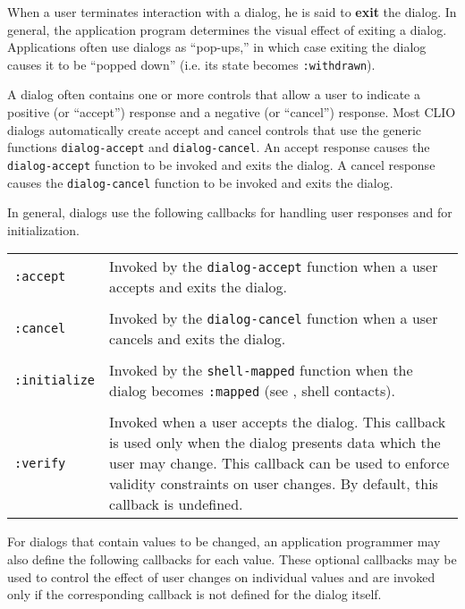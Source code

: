  
When a user terminates
interaction with a dialog, he is said to {\bf exit} the dialog.
 In general, the application program determines the
visual effect of exiting a dialog.  Applications often use dialogs as
``pop-ups,'' in which case exiting the dialog causes it to be ``popped down''
(i.e.  its state becomes {\tt :withdrawn}).  

A dialog often contains one or more controls that allow a user to indicate a
positive (or ``accept'') response and a negative (or ``cancel'') response.
Most CLIO dialogs automatically create accept and cancel controls that use
the generic functions {\tt dialog-accept} and {\tt dialog-cancel}.  An accept
response causes the {\tt dialog-accept} function to be invoked and exits the
dialog.  A cancel response causes the {\tt dialog-cancel} function to be
invoked and exits the dialog.

In general, dialogs use the following callbacks for handling
user responses and for initialization.

\begin{center}
\begin{tabular}[t]{lp{5in}}
{\tt :accept} & Invoked by the {\tt dialog-accept} function when a user accepts and
exits the dialog. \\
\\	
{\tt :cancel} & Invoked by the {\tt dialog-cancel} function when a user
cancels and exits the dialog.\\ 
\\
{\tt :initialize} & Invoked by the {\tt shell-mapped} function when the dialog
becomes {\tt :mapped} (see \cite{clue}, shell contacts).\\
\\
{\tt :verify} & Invoked when a user accepts the dialog. This callback is used
only when the dialog presents data which the user may change. This
callback can be used to enforce validity constraints on user changes. By
default, this callback is undefined.\\

\end{tabular}
\end{center}

For dialogs that contain values to be changed, an application programmer may
also define the following callbacks for each value.  These optional callbacks
may be used to control the effect of user changes on individual values and are
invoked only if the corresponding callback is not defined for the dialog
itself.

